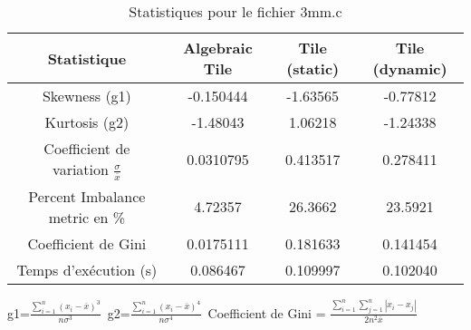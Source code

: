 \documentclass{article}
\begin{document}
\begin{table}[htbp]
  \centering
  \caption{Statistiques pour le fichier 3mm.c}
  \begin{tabular}{|c|c|c|c|}
    \hline
    Statistique & Algebraic Tile & Tile (static) & Tile (dynamic) \\ 
    \hline
    Skewness (g1)  & -0.150444 & -1.63565 & -0.77812 \\ 
    Kurtosis (g2)  & -1.48043 & 1.06218 & -1.24338 \\ 
    Coefficient de variation $ \frac{\sigma}{\overline{x}} $ & 0.0310795 & 0.413517 & 0.278411\\ 
    Percent Imbalance metric en \% & 4.72357 & 26.3662 & 23.5921\\ 
    Coefficient de Gini  & 0.0175111 & 0.181633 & 0.141454\\ 
    Temps d'exécution (s) &  0.086467    &  0.109997   &  0.102040   \\ 

    \hline
  \end{tabular}
\end{table}
g1=$ \frac{\sum_{i=1}^{n} (x_i - \overline{x})^3}{n\sigma^3} $\
g2=$ \frac{\sum_{i=1}^{n} (x_i - \overline{x})^4}{n\sigma^4} $\
Coefficient de Gini = $ \frac{\sum_{i=1}^{n}\sum_{j=1}^{n} |x_i - x_j|}{2n^2\overline{x}} $\
\newpage
\end{document}
